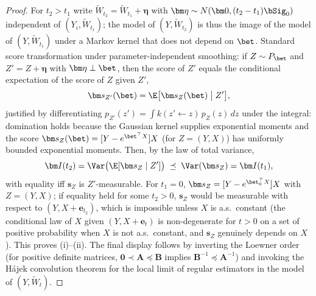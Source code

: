 \begin{proof}
For $t_2>t_1$ write $\widetilde W_{t_2}
=\widetilde W_{t_1}+\bm\eta$ with
$\bm\eta\sim N(\bm 0,(t_2-t_1)\bSig_0)$ independent of
$(Y_i,\widetilde W_{t_1})$; the model of $(Y,\widetilde W_{t_2})$ is
thus the image of the model of $(Y,\widetilde W_{t_1})$ under a
Markov kernel that does not depend on $\bet$. Standard score
transformation under parameter-independent smoothing: if $Z\sim P_{\bet}$
and $Z'=Z+\bm\eta$ with $\bm\eta\perp\bet$, then the score of $Z'$
equals the conditional expectation of the score of $Z$ given $Z'$,
\[
  \bm s_{Z'}(\bet)=\E\bigl[\bm s_Z(\bet)\bigm|Z'\bigr],
\]
justified by differentiating
$p_{Z'}(z')=\int k(z'\leftarrow z)\,p_Z(z)\,dz$ under the integral:
domination holds because the Gaussian kernel supplies exponential
moments and the score
$\bm s_Z(\bet)=[Y-e^{\bet^\top X}]X$ (for $Z=(Y,X)$) has uniformly
bounded exponential moments. Then, by the law of total variance,
\[
  \bm I(t_2)=\Var\bigl(\E[\bm s_Z\mid Z']\bigr)
  \;\preceq\;\Var(\bm s_Z)=\bm I(t_1),
\]
with equality iff $\bm s_Z$ is $Z'$-measurable. For $t_1=0$,
$\bm s_Z=[Y-e^{\bet_0^\top X}]X$ with $Z=(Y,X)$; if equality held for
some $t_2>0$, $\bm s_Z$ would be measurable with respect to
$(Y,X+\bm e_{t_2})$, which is impossible unless $X$ is a.s.\ constant
(the conditional law of $X$ given $(Y,X+\bm e_t)$ is non-degenerate for
$t>0$ on a set of positive probability when $X$ is not a.s.\ constant,
and $\bm s_Z$ genuinely depends on $X$). This proves (i)--(ii). The
final display follows by inverting the Loewner order (for positive
definite matrices, $\bm 0\prec\bm A\preceq\bm B$ implies
$\bm B^{-1}\preceq\bm A^{-1}$) and invoking the H\'ajek convolution
theorem for the local limit of regular estimators in the model of
$(Y,\widetilde W_t)$.
\end{proof}

